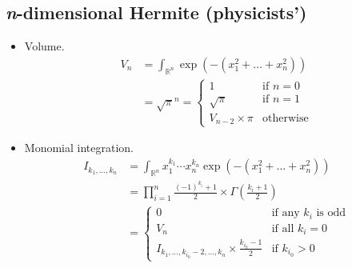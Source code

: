 \documentclass[draft]{scrartcl}
\begin{document}
\subsection*{\textit{n}-dimensional Hermite (physicists')}
\begin{itemize}
  \item Volume.
\[
  \begin{split}
  V_n
  &= \int_{\mathbb{R}^n} \exp\left(-(x_1^2+\dots+x_n^2)\right)\\
  &= \sqrt{\pi}^n
   = \begin{cases}
     1&\text{if $n=0$}\\
     \sqrt{\pi}&\text{if $n=1$}\\
     V_{n-2} \times \pi&\text{otherwise}
   \end{cases}
  \end{split}
\]

  \item Monomial integration.
  \[
    \begin{split}
    I_{k_1,\dots,k_n}
    &= \int_{\mathbb{R}^n} x_1^{k_1}\cdots x_n^{k_n} \exp(-(x_1^2+\dots+x_n^2))\\
    &= \prod_{i=1}^n \frac{(-1)^{k_i} + 1}{2} \times \Gamma\left(\frac{k_i+1}{2}\right)\\
    &=\begin{cases}
      0&\text{if any $k_i$ is odd}\\
      V_n&\text{if all $k_i=0$}\\
      I_{k_1,\dots,k_{i_0}-2,\dots,k_n} \times \frac{k_{i_0} - 1}{2}&\text{if $k_{i_0} > 0$}
    \end{cases}
    \end{split}
  \]
\end{itemize}
\end{document}
